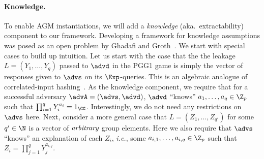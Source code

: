 {\begin{itemize}
\paragraph*{Knowledge.} To enable AGM instantiations, we will add a \emph{knowledge} (aka.~extractability) component to our framework. 
Developing a  framework for  knowledge assumptions was posed as an open problem by Ghadafi and Groth~\cite{AC:GhaGro17}.  We start with special cases to build up intuition.
Let us start with the case  that the  the leakage $L = (Y_1, \ldots, Y_q)$ passed to $\advd$ in the PGG1 game is simply the vector of responses given to $\advs$ on its $\Exp$-queries. This is an algebraic analogue of correlated-input hashing~\cite{TCC:GoyOneRao11}. As the knowledge component,   we require that for a successful adversary $\advA = (\advs,\advd)$,  $\advd$ ``knows''  $a_1,\ldots,a_q \in \Z_p$ such that $\prod_{i=1}^q Y_i^{a_i} = 1_{\GG}$. Interestingly, we do not need any restrictions on $\advs$ here. Next, consider a more general case that  $L = (Z_1,\ldots,Z_{q'})$ for some $q' \in \N$ is a vector of $\emph{arbitrary}$ group elements. Here we also require that  $\advs$ ``knows'' an explanation of each $Z_i$, \emph{i.e.}, some $a_{i,1}, \ldots, a_{i,q} \in \Z_p$ such that  $Z_i =  \prod_{j =1}^{q} Y_j^{a_{i,j}}$.


\end{itemize}}
